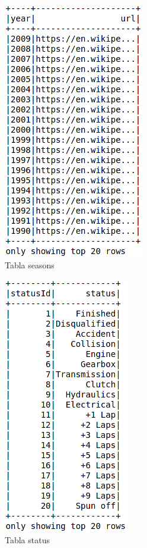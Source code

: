 \documentclass[12pt,twoside,titlepage]{report}
\begin{document}
\begin{figure}
  \includegraphics[scale=0.4]{season_table.png}
  \centering
  \caption{Tabla seasons}
  \label{fig:seasonstable}
  \centering
\end{figure}

\begin{figure}
  \includegraphics[scale=0.4]{status_table.png}
  \centering
  \caption{Tabla status}
  \label{fig:statustable}
  \centering
\end{figure}
\end{document}
